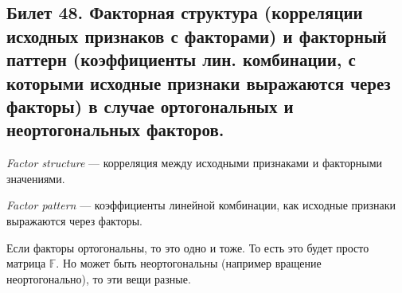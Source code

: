 \subsection{Билет 48. Факторная структура (корреляции исходных признаков с факторами) и факторный паттерн (коэффициенты лин. комбинации, с которыми исходные признаки выражаются через факторы) в случае ортогональных и неортогональных факторов.}
\begin{dfn}
    \textit{Factor structure} --- корреляция между исходными признаками и факторными значениями.
\end{dfn}

\begin{dfn}
    \textit{Factor pattern} --- коэффициенты линейной комбинации, как исходные признаки выражаются через факторы.
\end{dfn}
Если факторы ортогональны, то это одно и тоже. То есть это будет просто матрица $\mathbb{F}$. Но может быть неортогональны (например вращение неортогонально), то эти вещи разные.